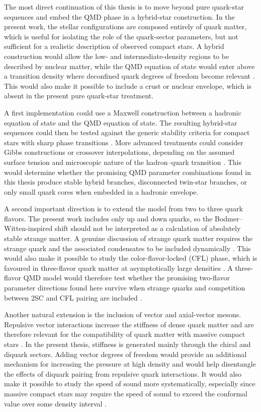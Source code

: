 The most direct continuation of this thesis is to move beyond pure quark-star
sequences and embed the QMD phase in a hybrid-star construction. In the present
work, the stellar configurations are composed entirely of quark matter, which is
useful for isolating the role of the quark-sector parameters, but not sufficient
for a realistic description of observed compact stars. A hybrid construction
would allow the low- and intermediate-density regions to be described by nuclear
matter, while the QMD equation of state would enter above a transition density
where deconfined quark degrees of freedom become relevant
\cite{Baym2018,Alford2013,Annala2020,Andersen2026}. This would also make it
possible to include a crust or nuclear envelope, which is absent in the present
pure quark-star treatment.

A first implementation could use a Maxwell construction between a hadronic
equation of state and the QMD equation of state. The resulting hybrid-star
sequences could then be tested against the generic stability criteria for compact
stars with sharp phase transitions \cite{Alford2013}. More advanced treatments
could consider Gibbs constructions or crossover interpolations, depending on the
assumed surface tension and microscopic nature of the hadron--quark transition
\cite{Baym2018,Masuda2013,Kurkela2014}. This would determine whether the
promising QMD parameter combinations found in this thesis produce stable hybrid
branches, disconnected twin-star branches, or only small quark cores when
embedded in a hadronic envelope.

A second important direction is to extend the model from two to three quark
flavors. The present work includes only up and down quarks, so the
Bodmer--Witten-inspired shift should not be interpreted as a calculation of
absolutely stable strange matter. A genuine discussion of strange quark matter
requires the strange quark and the associated condensates to be included
dynamically \cite{Bodmer1971,Witten1984,Baym2018}. This would also make it
possible to study the color-flavor-locked (CFL) phase, which is favoured
in three-flavor quark matter at asymptotically large densities
\cite{Alford2008}. A three-flavor QMD model would therefore test whether the
promising two-flavor parameter directions found here survive when strange quarks
and competition between 2SC and CFL pairing are included
\cite{Alford2008,Andersen2026}.

Another natural extension is the inclusion of vector and axial-vector mesons.
Repulsive vector interactions increase the stiffness of dense quark matter
and are therefore relevant for the compatibility of quark matter with massive
compact stars \cite{Klahn2015,Otto2020}. In the present thesis, stiffness is
generated mainly through the chiral and diquark sectors. Adding vector degrees
of freedom would provide an additional mechanism for increasing the pressure at
high density and would help disentangle the effects of diquark pairing from
repulsive quark interactions. It would also make it possible to study the speed
of sound more systematically, especially since massive compact stars may require
the speed of sound to exceed the conformal value over some density interval
\cite{Bedaque2015,Tews2018,Annala2020,Komoltsev2022}.


